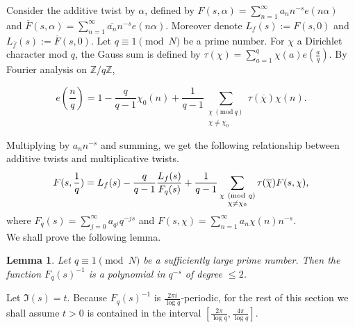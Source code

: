 \documentclass[a4paper,12.5pt]{amsart}
\newtheorem{lem}[thm]{Lemma}
\theoremstyle{definition}
\theoremstyle{remark}
\newcommand{\F}{L_f}
\newcommand{\Mod}[1]{\ (\mathrm{mod}\ #1)}
\begin{document}
Consider the additive twist by $\alpha$, defined by $F(s,\alpha)= \sum_{n=1}^{\infty} a_n n^{-s} e(n\alpha)$ and $\overline{F} (s,\alpha)=  \sum_{n=1}^{\infty}  \overline{a_n} n^{-s} e(n\alpha)  $. Moreover denote $\F (s):= F(s,0)$ and $ L_{\overline{f}}( s):= \overline{ F} (s,0)$. Let $q  \equiv 1 \pmod{N} $ be a prime number. 
For $\chi$ a Dirichlet character mod $q$, the Gauss sum is defined by $ \tau(\chi)= \sum_{a=1}^{q} \chi(a) e( \frac{a}{q})$.
By Fourier analysis on $\mathbb{Z}/ q \mathbb{Z}$, 

 \[  e( \frac{n}{q}) =1 - \frac{q}{q-1}  \chi_0 (n) + \frac{1}{q-1} \sum_{ \substack{  \chi \Mod q  \\ 
 \chi \neq \chi_0   }     }    \tau (\overline{ \chi}) \chi(n) .  \]

 Multiplying  by $a_n n^{-s}$ and summing, we get the following relationship between additive twists and multiplicative twists.  
 \begin{equation}{\label{Twist in terms of non twists}}
      F(s, \frac{1}{q}) = \F(s) - \frac{q}{q-1} \frac{\F(s)}{F_q(s) } + \frac{1}{q-1} \sum_{ \substack{  \chi \Mod q  \\ 
 \chi \neq \chi_0   }     }  \tau(\overline{\chi}) F(s, \chi)   ,    
 \end{equation}  
 where $F_q(s) =  \sum_{j=0}^{\infty} a_{q^j} q^{-js} $ and $F(s, \chi)= \sum_{n=1}^{\infty} a_n \chi(n) n^{-s}$.  
 \\
We shall prove the following lemma.
\begin{lem}
\label{Euler Factors}
Let $q \equiv 1 \pmod{N}$ be a sufficiently large  prime number. Then the function $F_q(s)^{-1}$ is a polynomial in $q^{-s}$ of degree $\leq 2$. 
\end{lem}
Let $\Im(s)=t$.  Because $F_q(s)^{-1}$  is $ \frac{ 2 \pi i}{\log q}$-periodic, for the rest of this section we shall assume $t>0$ is contained in the interval $\left[ \frac{ 2 \pi }{\log q}, \frac{ 4 \pi }{\log q} \right] $.
\end{document}
